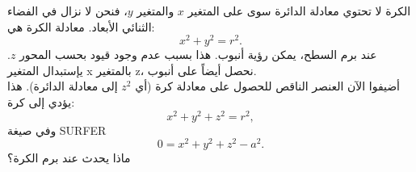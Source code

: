 \begin{surferPage}[Sphere]{الكرة}
لا تحتوي معادلة الدائرة سوى على المتغير $x$ والمتغير $y$، فنحن لا نزال في الفضاء الثنائي الأبعاد.
معادلة الكرة هي:
\[x^2+y^2=r^2.\]
عند برم السطح، يمكن رؤية أنبوب. هذا بسبب عدم وجود قيود بحسب المحور $z$. يإستبدال المتغير x بالمتغير z، نحصل أيضاً على أنبوب.\\
أضيفوا الآن العنصر الناقص للحصول على معادلة كرة (أي $ z^2 $ إلى معادلة الدائرة). هذا يؤدي إلى كرة:
\[x^2+y^2+z^2=r^2,\]
وفي صيغة SURFER
\[0=x^2+y^2+z^2-a^2.\]
ماذا يحدث عند برم الكرة؟
\end{surferPage}